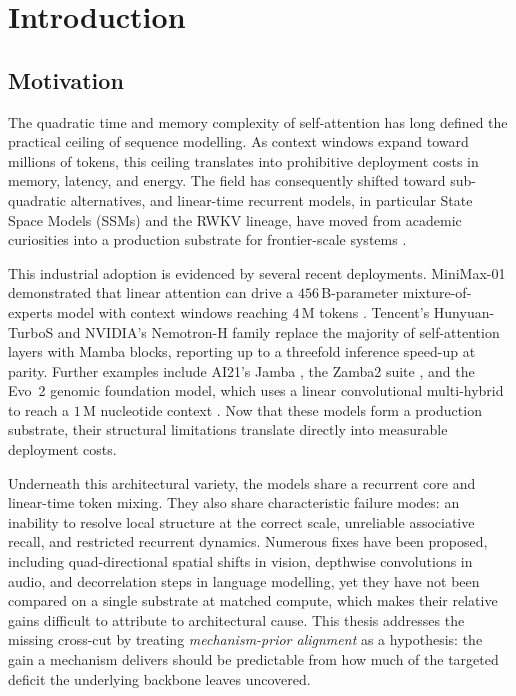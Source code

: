\chapter{Introduction}\label{ch:introduction}

\section{Motivation}

The quadratic time and memory complexity of self-attention
\cite{vaswani2017attention} has long defined the practical ceiling
of sequence modelling. As context windows expand toward millions
of tokens, this ceiling translates into prohibitive deployment
costs in memory, latency, and energy. The field has consequently
shifted toward sub-quadratic alternatives, and linear-time
recurrent models, in particular State Space Models (SSMs) and
the RWKV lineage, have moved from academic curiosities into a
production substrate for frontier-scale systems
\cite{li2025minimax01,liu2025hunyuanturbos}.

This industrial adoption is evidenced by several recent
deployments. MiniMax-01 demonstrated that linear attention can
drive a $456$\,B-parameter mixture-of-experts model with context
windows reaching $4$\,M tokens \cite{li2025minimax01}. Tencent's
Hunyuan-TurboS \cite{liu2025hunyuanturbos} and NVIDIA's
Nemotron-H family \cite{blakeman2025nemotronh} replace the
majority of self-attention layers with Mamba blocks, reporting up
to a threefold inference speed-up at parity. Further examples
include AI21's Jamba \cite{lieber2024jamba}, the Zamba2 suite
\cite{glorioso2024zamba2}, and the Evo~2 genomic foundation model,
which uses a linear convolutional multi-hybrid to reach a $1$\,M
nucleotide context \cite{brixi2026evo2}. Now that these models
form a production substrate, their structural limitations
translate directly into measurable deployment costs.

Underneath this architectural variety, the models share a
recurrent core and linear-time token mixing. They also share
characteristic failure modes: an inability to resolve local
structure at the correct scale, unreliable associative recall,
and restricted recurrent dynamics. Numerous fixes have been
proposed, including quad-directional spatial shifts in vision,
depthwise convolutions in audio, and decorrelation steps in
language modelling, yet they have not been compared on a single
substrate at matched compute, which makes their relative gains
difficult to attribute to architectural cause. This thesis
addresses the missing cross-cut by treating
\textit{mechanism-prior alignment} as a hypothesis: the gain a
mechanism delivers should be predictable from how much of the
targeted deficit the underlying backbone leaves uncovered.

